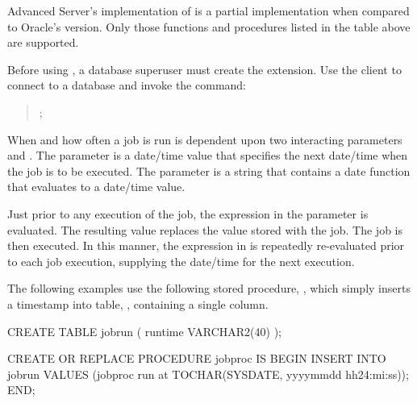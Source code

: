 \documentclass[letterpaper,10pt,english,openany,oneside]{sphinxmanual}
\begin{document}
Advanced Server’s implementation of  is a partial
implementation when compared to Oracle’s version. Only those functions
and procedures listed in the table above are supported.

Before using , a database superuser must create the 
extension. Use the  client to connect to a database and invoke the
command:
\begin{quote}

;
\end{quote}

When and how often a job is run is dependent upon two interacting
parameters \textendash{}  and . The  parameter is
a date/time value that specifies the next date/time when the job is to
be executed. The  parameter is a string that contains a date
function that evaluates to a date/time value.

Just prior to any execution of the job, the expression in the 
parameter is evaluated. The resulting value replaces the 
value stored with the job. The job is then executed. In this manner, the
expression in  is repeatedly re-evaluated prior to each job
execution, supplying the  date/time for the next execution.

The following examples use the following stored procedure, ,
which simply inserts a timestamp into table, , containing a single
 column.

\newpage

%
\begin{sphinxVerbatim}[commandchars=\\\{\}]
CREATE TABLE jobrun (
       runtime VARCHAR2(40)
);

CREATE OR REPLACE PROCEDURE job\PYGZus{}proc
IS
BEGIN
    INSERT INTO jobrun VALUES (\PYGZsq{}job\PYGZus{}proc run at \PYGZsq{} \textbar{}\textbar{} TO\PYGZus{}CHAR(SYSDATE,
        \PYGZsq{}yyyy\PYGZhy{}mm\PYGZhy{}dd hh24:mi:ss\PYGZsq{}));
END;
\end{sphinxVerbatim}
\end{document}
